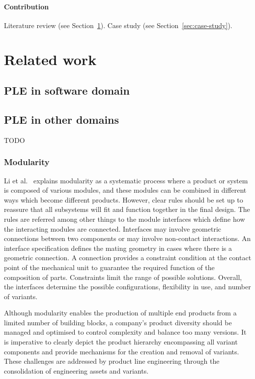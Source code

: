 \documentclass[sigconf,review]{acmart}
\begin{document}
\paragraph{Contribution}

Literature review (see Section~\ref{sec:related-work}). Case study (see Section~\ref{sec:case-study}).

\section{Related work}
\label{sec:related-work}




\subsection{PLE in software domain}
\subsection{PLE in other domains}
\label{sec:modualarity}

TODO

\subsubsection{Modularity}

Li et al.~\cite{Li_2019} explains modularity as a systematic process where a product or system is composed of various modules, and these modules can be combined in different ways which become different products. 
However, clear rules should be set up to reassure that all subsystems will fit and function together in the final design.
The rules are referred among other things to the module interfaces which define how the interacting modules are connected.
Interfaces may involve geometric connections between two components or may involve non-contact interactions. An interface specification defines the mating geometry in cases where there is a geometric connection.
A connection provides a constraint condition at the contact point of the mechanical unit to guarantee the required function of the composition of parts.
Constraints limit the range of possible solutions.
Overall, the interfaces determine the possible configurations, flexibility in use, and number of variants. 

Although modularity enables the production of  multiple end products from a limited number of building blocks, a company's product diversity should be managed and optimised to control complexity and balance too many versions. 
It is imperative to clearly depict the product hierarchy encompassing all variant components and provide mechanisms for the creation and removal of variants. 
These challenges are addressed by product line engineering through the consolidation of engineering assets and variants.
\end{document}
